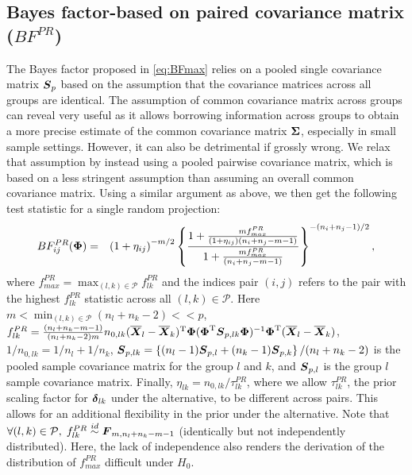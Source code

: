 \documentclass[times,sort&compress,3p]{elsarticle}
\theoremstyle{plain}%
\theoremstyle{definition}
\def\be{\begin{eqnarray}}
\def\ee{\end{eqnarray}}
\def\trans{^{\rm T}}
\newcommand{\uF}       {\mbox{\boldmath$F$}}
\newcommand{\uS}       {\mbox{\boldmath$S$}}
\newcommand{\uX}       {\mbox{\boldmath$X$}}
\newcommand{\udelta}            {\mbox{\boldmath$\delta$}}
\newcommand{\uSigma}            {\mbox{\boldmath$\Sigma$}}
\newcommand{\uPhi}              {\mbox{\boldmath$\Phi$}}
\begin{document}
\subsection{Bayes factor-based on paired covariance matrix ($BF^{PR}_{}$)} \label{sec:testid}
The Bayes factor proposed in \eqref{eq:BFmax} relies on a pooled single covariance matrix $\uS_p$ based on the assumption that the covariance matrices across all groups are identical. The assumption of common covariance matrix across groups can reveal very useful as it allows borrowing information across groups to obtain a more precise estimate of the common covariance matrix $\uSigma$, especially in small sample settings. However, it can also be detrimental if grossly wrong. We relax that assumption by instead using a pooled pairwise covariance matrix, which is based on a less stringent assumption than assuming an overall common covariance matrix. Using a similar argument as above, we then get the following test statistic for a single random projection:
\be
BF^{PR}_{ij}(\uPhi) &=& \left(1 + \eta_{ij} \right)^{-m/2} \left\{ \frac{1 + \frac{m f^{PR}_{max}}{(1 + \eta_{ij})(n_{i}+n_{j}-m-1)}}{ 1 + \frac{m f^{PR}_{max}}{(n_{i}+n_{j}-m-1)}  } \right\}^{-(n_{i}+n_{j}-1)/2}, \label{eq:BFmaxij}
\ee
where
$
f^{PR}_{max} = \max_{(l, k)\in\mathcal{P}}f^{PR}_{lk}
$ and the indices pair $(i,j)$ refers to the pair with the highest $f^{PR}_{lk}$ statistic across all $(l, k)\in\mathcal{P}$.
Here $m < \min_{(l, k)\in\mathcal{P}}(n_{l}+n_{k} - 2) << p$,
$f^{PR}_{lk}  = \frac{(n_{l}+n_{k} - m - 1)}{(n_{l}+n_{k} -2)m} n_{0,lk} (\overline{\uX}_l - \overline{\uX}_k)\trans\uPhi (\uPhi\trans\uS_{p,lk}\uPhi)^{-1}\uPhi\trans(\overline{\uX}_l - \overline{\uX}_k)$,
$1/n_{0,lk} = 1/n_l + 1/n_k$, $\uS_{p,lk} =\left\{ (n_{l}-1)\uS_{p,l} + (n_{k}-1)\uS_{p,k} \right\}/(n_{l} + n_{k} -2)$ is the pooled sample covariance matrix for the group $l$ and $k$, 
and $\uS_{p,l}$ is the group $l$ sample covariance matrix.
Finally, $\eta_{lk} = n_{0,lk} /\tau^{PR}_{lk}$, where we allow $\tau^{PR}_{lk}$, the prior scaling factor for $\udelta_{lk}$ under the alternative, to be different across pairs. This allows for an additional flexibility in the prior under the alternative.  
Note that $\forall (l,k) \in \mathcal{P}, \; f^{PR}_{lk} \stackrel{id}{\sim} \uF_{m, n_{l}+n_{k} - m- 1}$ (identically but not independently distributed). Here, the lack of independence also renders the derivation of the distribution of $f^{PR}_{max}$ difficult under $H_0$. %
\end{document}
